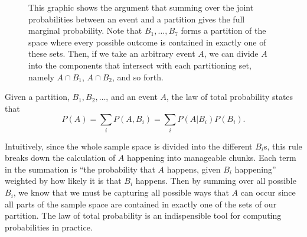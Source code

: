 \documentclass[
  letterpaper,
  DIV=11,
  numbers=noendperiod]{scrreprt}
\theoremstyle{definition}
\theoremstyle{definition}
\theoremstyle{definition}
\theoremstyle{remark}
\begin{document}
\begin{figure}[H]

\caption{\label{fig-basic-partition}This graphic shows the argument that
summing over the joint probabilities between an event and a partition
gives the full marginal probability. Note that \(B_1,\dots,B_7\) forms a
partition of the space where every possible outcome is contained in
exactly one of these sets. Then, if we take an arbitrary event \(A\), we
can divide \(A\) into the components that intersect with each
partitioning set, namely \(A \cap B_1\), \(A \cap B_2\), and so forth.}


\end{figure}%

\begin{tcolorbox}[enhanced jigsaw, coltitle=black, colframe=quarto-callout-tip-color-frame, colbacktitle=quarto-callout-tip-color!10!white, bottomrule=.15mm, opacitybacktitle=0.6, colback=white, toptitle=1mm, arc=.35mm, leftrule=.75mm, bottomtitle=1mm, opacityback=0, breakable, rightrule=.15mm, title={The Law of Total Probability}, left=2mm, titlerule=0mm, toprule=.15mm]

Given a partition, \(B_1, B_2, \dots\), and an event \(A\), the law of
total probability states that
\[P(A) = \sum_i P(A, B_i) = \sum_i P(A|B_i)P(B_i).\]

\end{tcolorbox}

Intuitively, since the whole sample space is divided into the different
\(B_i\)s, this rule breaks down the calculation of \(A\) happening into
manageable chunks. Each term in the summation is ``the probability that
\(A\) happens, given \(B_i\) happening'' weighted by how likely it is
that \(B_i\) happens. Then by summing over all possible \(B_i\), we know
that we must be capturing all possible ways that \(A\) can occur since
all parts of the sample space are contained in exactly one of the sets
of our partition. The law of total probability is an indispensible tool
for computing probabilities in practice.
\end{document}
